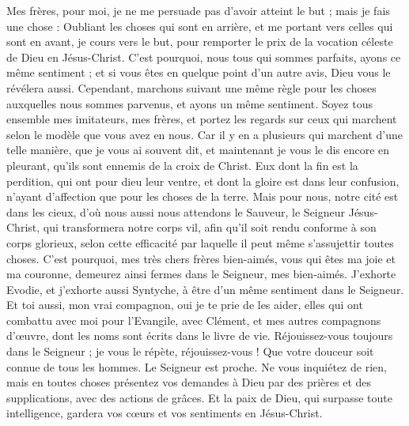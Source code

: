 \begin{multicols}{2}
Mes frères, pour moi, je ne me persuade pas d'avoir atteint le but ;
mais je fais une chose : Oubliant les choses qui sont en arrière, et me portant vers celles qui sont en avant, je cours vers le but, pour remporter le prix de la vocation céleste de Dieu en Jésus-Christ.
C'est pourquoi, nous tous qui sommes parfaits, ayons ce même sentiment ; et si vous êtes en quelque point d'un autre avis, Dieu vous le révélera aussi.
Cependant, marchons suivant une même règle pour les choses auxquelles nous sommes parvenus, et ayons un même sentiment.
Soyez tous ensemble mes imitateurs, mes frères, et portez les regards sur ceux qui marchent selon le modèle que vous avez en nous.
Car il y en a plusieurs qui marchent d'une telle manière, que je vous ai souvent dit, et maintenant je vous le dis encore en pleurant, qu'ils sont ennemis de la croix de Christ. 
Eux dont la fin est la perdition, qui ont pour dieu leur ventre, et dont la gloire est dans leur confusion, n'ayant d'affection que pour les choses de la terre.
Mais pour nous, notre cité est dans les cieux, d'où nous aussi nous attendons le Sauveur, le Seigneur Jésus-Christ,
qui transformera notre corps vil, afin qu'il soit rendu conforme à son corps glorieux, selon cette efficacité par laquelle il peut même s'assujettir toutes choses. 
\VerseOne{}C'est pourquoi, mes très chers frères bien-aimés, vous qui êtes ma joie et ma couronne, demeurez ainsi fermes dans le Seigneur, mes bien-aimés.
J'exhorte Evodie, et j'exhorte aussi Syntyche, à être d'un même sentiment dans le Seigneur.
Et toi aussi, mon vrai compagnon, oui je te prie de les aider, elles qui ont combattu avec moi pour l'Evangile, avec Clément, et mes autres compagnons d'œuvre, dont les noms sont écrits dans le livre de vie.
Réjouissez-vous toujours dans le Seigneur ; je vous le répète, réjouissez-vous !
Que votre douceur soit connue de tous les hommes. Le Seigneur est proche.
Ne vous inquiétez de rien, mais en toutes choses présentez vos demandes à Dieu par des prières et des supplications, avec des actions de grâces.
Et la paix de Dieu, qui surpasse toute intelligence, gardera vos cœurs et vos sentiments en Jésus-Christ.

\end{multicols}

